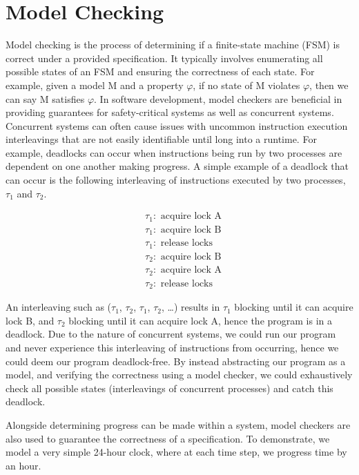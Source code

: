 \section{Model Checking} \label{sec:model_checking}
Model checking is the process of determining if a finite-state machine (FSM) is correct under a provided specification. It typically involves enumerating all possible states of an FSM and ensuring the correctness of each state. For example, given a model M and a property $\varphi$, if no state of M violates $\varphi$, then we can say M satisfies $\varphi$. In software development, model checkers are beneficial in providing guarantees for safety-critical systems as well as concurrent systems. Concurrent systems can often cause issues with uncommon instruction execution interleavings that are not easily identifiable until long into a runtime. For example, deadlocks can occur when instructions being run by two processes are dependent on one another making progress. A simple example of a deadlock that can occur is the following interleaving of instructions executed by two processes, $\tau_1$ and $\tau_2$. 
\begin{multicols}{2}
    \[
    \begin{aligned}
    & \tau_1: \text{ acquire lock A} \\
    & \tau_1: \text{ acquire lock B} \\
    & \tau_1: \text{ release locks}
    \end{aligned}
    \]
    \vline
    \[
    \begin{aligned}
    & \tau_2: \text{ acquire lock B} \\
    & \tau_2: \text{ acquire lock A} \\
    & \tau_2: \text{ release locks}
    \end{aligned}
    \]
    \end{multicols}
An interleaving such as ($\tau_1$, $\tau_2$, $\tau_1$, $\tau_2$, \dots) results in $\tau_1$ blocking until it can acquire lock B, and $\tau_2$ blocking until it can acquire lock A, hence the program is in a deadlock. Due to the nature of concurrent systems, we could run our program and never experience this interleaving of instructions from occurring, hence we could deem our program deadlock-free. By instead abstracting our program as a model, and verifying the correctness using a model checker, we could exhaustively check all possible states (interleavings of concurrent processes) and catch this deadlock. 
\par
Alongside determining progress can be made within a system, model checkers are also used to guarantee the correctness of a specification. To demonstrate, we model a very simple 24-hour clock, where at each time step, we progress time by an hour.
